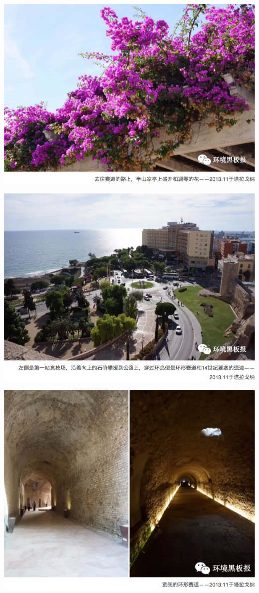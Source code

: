 \documentclass[]{book}
\begin{document}
\includegraphics[width=8.33in]{images/xt32}

\includegraphics[width=8.33in]{images/xt33}

\includegraphics[width=8.33in]{images/xt34}
\end{document}
